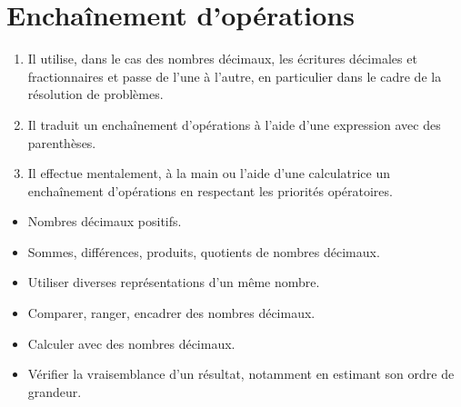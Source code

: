 \themaN

\chapter{Enchaînement d'opérations}
\label{S01}




\begin{autoeval}
   \small
   \begin{enumerate}
      \item Il utilise, dans le cas des nombres décimaux, les écritures décimales et fractionnaires et passe de l’une à l’autre, en particulier dans le cadre de la résolution de problèmes.
      \item Il traduit un enchaînement d’opérations à l’aide d’une expression avec des parenthèses.
      \item Il effectue mentalement, à la main ou l’aide d’une calculatrice un enchaînement d’opérations en respectant les priorités opératoires.
   \end{enumerate}
\end{autoeval}

\vspace*{-10mm}

\begin{prerequis}
   \small
   \begin{itemize}
      \item Nombres décimaux positifs.
      \item Sommes, différences, produits, quotients de nombres décimaux.
      \item Utiliser diverses représentations d'un même nombre.
      \item[\com] Comparer, ranger, encadrer des nombres décimaux.
      \item[\com] Calculer avec des nombres décimaux.
      \item[\com] Vérifier la vraisemblance d'un résultat, notamment en estimant son ordre de grandeur.
   \end{itemize}
\end{prerequis}

\vfill

